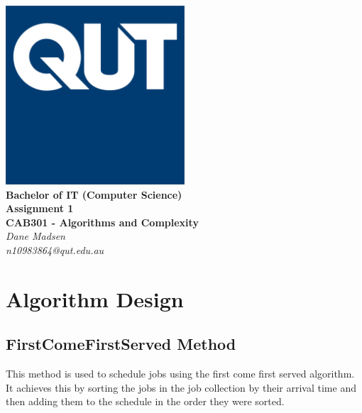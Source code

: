 \documentclass[12pt,a4paper]{article}
\begin{document}
	\begin{titlepage}
		
		\begin{center}
			\includegraphics[width=0.5\textwidth]{QUT.jpg}\\
			[0.03\textheight]  
			\Large\textbf{Bachelor of IT (Computer Science)}\\
			\Large\textbf{Assignment 1}\\
			\large\textbf{CAB301 - Algorithms and Complexity}\\
			[0.02\textheight]
			\large\textsl{Dane Madsen}\\
			\large\textsl{n10983864@qut.edu.au}
		\end{center}
		
	\end{titlepage}
	\tableofcontents
	\newpage
	
	\section{Algorithm Design}
		\subsection{FirstComeFirstServed Method}
			This method is used to schedule jobs using the first come first served algorithm. It achieves 
			this by sorting the jobs in the job collection by their arrival time and then adding them to 
			the schedule in the order they were sorted.\\
		
\end{document}

